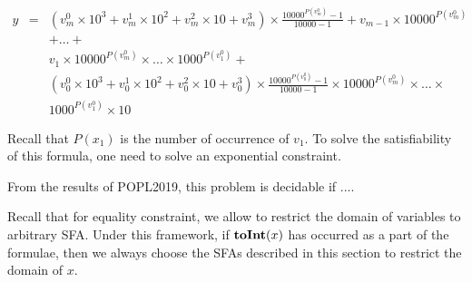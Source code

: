 \documentclass{llncs}
\begin{document}
\[\begin{array}{lcl}
	y & = & (v_m^0\times 10^3 + v_m^1 \times 10^2 + v_m^2 \times 10 +v_m^3 )\times \frac{10000^{P(v_m^0)}-1}{10000-1}+v_{m-1}\times 10000^{P(v_m^0)}\\
	
	  &   &+\ldots+ \\
	  
	  &   &v_1\times10000^{P(v_m^0)} \times \ldots \times 1000^{P(v_1^0)}+\\
	  &   &(v_0^0\times 10^3 + v_0^1 \times 10^2 + v_0^2 \times 10 +v_0^3 )\times \frac{10000^{P(v_0^0)}-1}{10000-1} \times 10000^{P(v_m^0)} \times \ldots \times \\
	  &   &1000^{P(v_1^0)} \times 10
\end{array}\]


Recall that $P(x_1)$ is the number of occurrence of $v_1$. To solve the satisfiability of this formula, one need to solve an exponential constraint. 


From the results of POPL2019, this problem is decidable if ....


Recall that for equality constraint, we allow to restrict the domain of variables to arbitrary SFA. Under this framework, if $\mbox{\textbf{toInt}($x$)}$ has occurred as a part of the formulae, then we always choose the SFAs described in this section to restrict the domain of $x$.
\end{document}
